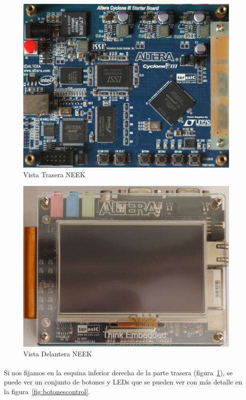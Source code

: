 \documentclass[a4paper,12pt,titlepage,final]{book}
\begin{document}
\begin{figure}[p]
\centering
\includegraphics[width=\textwidth]{./figuras/NEEK/Trasera.png}
\caption{Vista Trasera NEEK}
\label{fig:traseraneek}
\end{figure}

\begin{figure}[p]
\centering
\includegraphics[width=\textwidth]{./figuras/NEEK/Delantera.png}
\caption{Vista Delantera NEEK}
\label{fig:delanteraneek}
\end{figure}

\paragraph{}
Si nos fijamos en la esquina inferior derecha de la parte trasera (figura~\ref{fig:traseraneek}), se puede ver un conjunto de botones y LEDs que se pueden ver con más detalle en la figura~\ref{fig:botonescontrol}.
\end{document}
